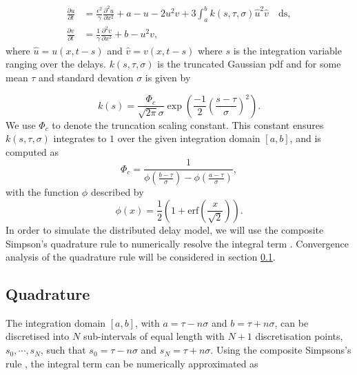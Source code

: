 \documentclass[12pt]{report}
\begin{document}
\begin{equation}
  \begin{split}
    \frac{\partial u}{\partial t}&=\frac{\epsilon^2}{\gamma}\frac{\partial^2u}{\partial x^2}+a-u-2u^2v+3\int_{a}^{b}k(s,\tau,\sigma)\hat{u}^2\hat{v} \quad\text{ds},\\
    \frac{\partial v}{\partial t}&=\frac{1}{\gamma}\frac{\partial^2v}{\partial x^2}+b-u^2v,
\end{split}
\end{equation}
where $\hat{u}=u(x,t-s)$ and $\hat{v}=v(x,t-s)$ where $s$ is the integration variable ranging over the delays. $k(s,\tau,\sigma)$ is the truncated Gaussian pdf and for some mean $\tau$ and standard devation $\sigma$ is given by \cite{wikitrunc}

\begin{equation}
  k(s)=\frac{\Phi_c}{\sqrt{2\pi}\sigma}\exp\left(\frac{-1}{2}\left(\frac{s-\tau}{\sigma}\right)^2\right).
\end{equation}
We use $\Phi_c$ to denote the truncation scaling constant. This constant ensures $k(s,\tau,\sigma)$ integrates to $1$ over the given integration domain $[a, b]$, and is computed as
\begin{equation}
\Phi_c=\frac{1}{\phi\left(\frac{b-\tau}{\sigma}\right)-\phi\left(\frac{a-\tau}{\sigma}\right)},
\end{equation}
with the function $\phi$ described by
\begin{equation}
\phi(x)=\frac{1}{2}\left(1+\text{erf}\left(\frac{x}{\sqrt{2}}\right)\right).
\end{equation}
In order to simulate the distributed delay model, we will use the composite Simpson's quadrature rule to numerically resolve the integral term \cite{compsimp}. Convergence analysis of the quadrature rule will be considered in section \ref{section:quad}.

\subsection{Quadrature}\label{section:quad}
The integration domain $[a, b]$, with $a=\tau-n\sigma$ and $b=\tau+n\sigma$, can be discretised into $N$ sub-intervals of equal length with $N+1$ discretisation points, $s_0,\cdots,s_{N}$, such that $s_0=\tau-n\sigma$ and $s_N=\tau+n\sigma$. Using the composite Simpsons's rule \cite{compsimp}, the integral term can be numerically approximated as
\end{document}

